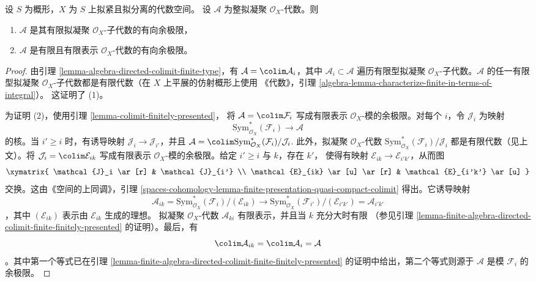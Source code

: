 \begin{lemma}
\label{lemma-integral-algebra-directed-colimit-finite}
设 $S$ 为概形，$X$ 为 $S$ 上拟紧且拟分离的代数空间。
设 $\mathcal{A}$ 为整拟凝聚 $\mathcal{O}_X$-代数。则
\begin{enumerate}
\item $\mathcal{A}$ 是其有限拟凝聚 $\mathcal{O}_X$-子代数的有向余极限，
\item $\mathcal{A}$ 是有限且有限表示 $\mathcal{O}_X$-代数的有向余极限。
\end{enumerate}
\end{lemma}

\begin{proof}
由引理 \ref{lemma-algebra-directed-colimit-finite-type}，有
$\mathcal{A} = \colim \mathcal{A}_i$，其中
$\mathcal{A}_i \subset \mathcal{A}$ 遍历有限型拟凝聚
$\mathcal{O}_X$-子代数。$\mathcal{A}$ 的任一有限型拟凝聚
$\mathcal{O}_X$-子代数都是有限代数（在 $X$ 上平展的仿射概形上使用
《代数》，引理
\ref{algebra-lemma-characterize-finite-in-terms-of-integral}）。
这证明了 (1)。

\medskip\noindent
为证明 (2)，使用引理 \ref{lemma-colimit-finitely-presented}，
将 $\mathcal{A} = \colim \mathcal{F}_i$ 写成有限表示
$\mathcal{O}_X$-模的余极限。对每个 $i$，令 $\mathcal{J}_i$
为映射
$$
\text{Sym}^*_{\mathcal{O}_X}(\mathcal{F}_i) \longrightarrow \mathcal{A}
$$
的核。当 $i' \geq i$ 时，有诱导映射
$\mathcal{J}_i \to \mathcal{J}_{i'}$，并且
$\mathcal{A} =
\colim \text{Sym}^*_{\mathcal{O}_X}(\mathcal{F}_i)/\mathcal{J}_i$.
此外，拟凝聚 $\mathcal{O}_X$-代数
$\text{Sym}^*_{\mathcal{O}_X}(\mathcal{F}_i)/\mathcal{J}_i$
都是有限代数（见上文）。将
$\mathcal{J}_i = \colim \mathcal{E}_{ik}$ 写成有限表示
$\mathcal{O}_X$-模的余极限。给定 $i' \geq i$ 与 $k$，存在 $k'$，
使得有映射 $\mathcal{E}_{ik} \to \mathcal{E}_{i'k'}$，从而图
$$
\xymatrix{
\mathcal{J}_i \ar[r] & \mathcal{J}_{i'} \\
\mathcal{E}_{ik} \ar[u] \ar[r] & \mathcal{E}_{i'k'} \ar[u]
}
$$
交换。这由《空间的上同调》，引理
\ref{spaces-cohomology-lemma-finite-presentation-quasi-compact-colimit}
得出。它诱导映射
$$
\mathcal{A}_{ik} =
\text{Sym}^*_{\mathcal{O}_X}(\mathcal{F}_i)/(\mathcal{E}_{ik})
\longrightarrow
\text{Sym}^*_{\mathcal{O}_X}(\mathcal{F}_{i'})/(\mathcal{E}_{i'k'}) =
\mathcal{A}_{i'k'}
$$
，其中 $(\mathcal{E}_{ik})$ 表示由 $\mathcal{E}_{ik}$ 生成的理想。
拟凝聚 $\mathcal{O}_X$-代数 $\mathcal{A}_{ki}$
有限表示，并且当 $k$ 充分大时有限
（参见引理
\ref{lemma-finite-algebra-directed-colimit-finite-finitely-presented}
的证明）。最后，有
$$
\colim \mathcal{A}_{ik} = \colim \mathcal{A}_i = \mathcal{A}
$$
。其中第一个等式已在引理
\ref{lemma-finite-algebra-directed-colimit-finite-finitely-presented}
的证明中给出，第二个等式则源于 $\mathcal{A}$ 是模
$\mathcal{F}_i$ 的余极限。
\end{proof}

